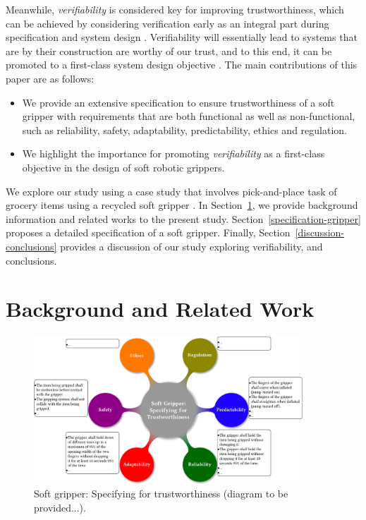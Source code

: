 \documentclass[lettersize,journal]{IEEEtran}
\begin{document}
Meanwhile, \emph{verifiability} is considered key for improving trustworthiness, which can be achieved by considering verification early as an integral part during specification and system design \cite{Mousavi2022}. Verifiability will essentially lead to systems that are by their construction are worthy of our trust, and to this end, it can be promoted to a first-class system design objective \cite{Eder2021}. The main contributions of this paper are as follows:
\begin{itemize}
	\item We provide an extensive specification to ensure trustworthiness of a soft gripper with requirements that are both functional as well as non-functional, such as reliability, safety, adaptability, predictability, ethics and regulation.
	\item We highlight the importance for promoting \emph{verifiability} as a first-class objective in the design of soft robotic grippers. 
\end{itemize}
We explore our study using a case study that involves pick-and-place task of grocery items using a recycled soft gripper \cite{Partridge2022}. 
In Section~\ref{background-relatedwork}, we provide background information and related works to the present study. 
Section~\ref{specification-gripper} proposes a detailed specification of a soft gripper. 
Finally, Section~\ref{discussion-conclusions} provides a discussion of our study exploring verifiability, and conclusions. 

\section{Background and Related Work}\label{background-relatedwork}

\begin{figure}
	\centering
	\includegraphics[width=0.9\textwidth]{figures/Fig1.png}
	\caption{Soft gripper: Specifying for trustworthiness (diagram to be provided...).}
	\label{SR-spec}
\end{figure}
\end{document}
